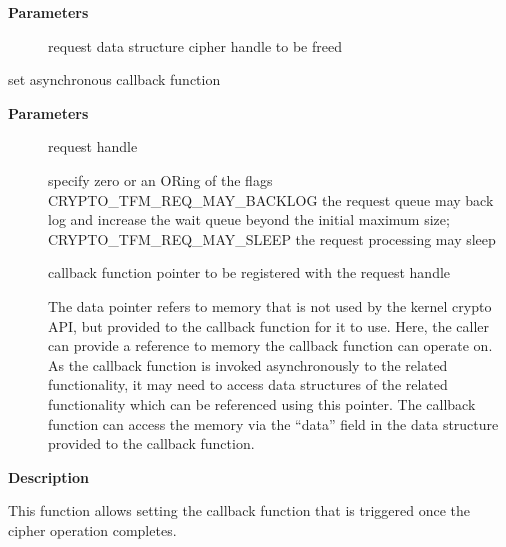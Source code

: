 \documentclass[a4paper,8pt,english]{sphinxmanual}
\begin{document}
\textbf{Parameters}
\begin{description}
\item[{}] \leavevmode
request data structure cipher handle to be freed

\end{description}

\begin{fulllineitems}
\label{crypto/api-digest:c.ahash_request_set_callback}
set asynchronous callback function

\end{fulllineitems}


\textbf{Parameters}
\begin{description}
\item[{}] \leavevmode
request handle

\item[{}] \leavevmode
specify zero or an ORing of the flags
CRYPTO\_TFM\_REQ\_MAY\_BACKLOG the request queue may back log and
increase the wait queue beyond the initial maximum size;
CRYPTO\_TFM\_REQ\_MAY\_SLEEP the request processing may sleep

\item[{}] \leavevmode
callback function pointer to be registered with the request handle

\item[{}] \leavevmode
The data pointer refers to memory that is not used by the kernel
crypto API, but provided to the callback function for it to use. Here,
the caller can provide a reference to memory the callback function can
operate on. As the callback function is invoked asynchronously to the
related functionality, it may need to access data structures of the
related functionality which can be referenced using this pointer. The
callback function can access the memory via the ``data'' field in the
 data structure provided to the callback function.

\end{description}

\textbf{Description}

This function allows setting the callback function that is triggered once
the cipher operation completes.
\end{document}
